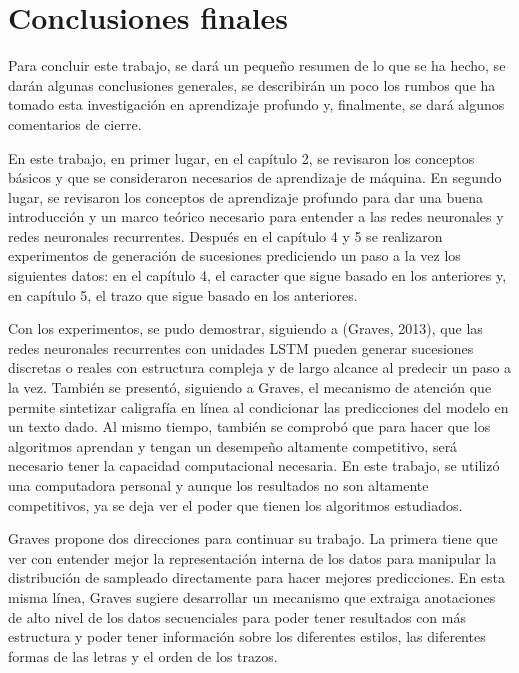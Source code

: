 \section{Conclusiones finales}
Para concluir este trabajo, se dará un pequeño resumen de lo que se ha hecho, se darán algunas conclusiones generales, se describirán un poco los rumbos que ha tomado esta investigación en aprendizaje profundo y, finalmente, se dará algunos comentarios de cierre.

\vspace{1em}

En este trabajo, en primer lugar, en el capítulo 2, se revisaron los conceptos básicos y que se consideraron necesarios de aprendizaje de máquina. En segundo lugar, se revisaron los conceptos de aprendizaje profundo para dar una buena introducción y un marco teórico necesario para entender a las redes neuronales y redes neuronales recurrentes. Después en el capítulo 4 y 5 se realizaron experimentos de generación de sucesiones prediciendo un paso a la vez los siguientes datos: en el capítulo 4, el caracter que sigue basado en los anteriores y, en capítulo 5, el trazo que sigue basado en los anteriores.

\vspace{1em}

Con los experimentos, se pudo demostrar, siguiendo a (Graves, 2013), que las redes neuronales recurrentes con unidades LSTM pueden generar sucesiones discretas o reales con estructura compleja y de largo alcance al predecir un paso a la vez. También se presentó, siguiendo a Graves, el mecanismo de atención que permite sintetizar caligrafía en línea al condicionar las predicciones del modelo en un texto dado. Al mismo tiempo, también se comprobó que para hacer que los algoritmos aprendan y tengan un desempeño altamente competitivo, será necesario tener la capacidad computacional necesaria. En este trabajo, se utilizó una computadora personal y aunque los resultados no son altamente competitivos, ya se deja ver el poder que tienen los algoritmos estudiados.
\cite{DBLP:journals/corr/Graves13}

\vspace{1em}

Graves propone dos direcciones para continuar su trabajo. La primera tiene que ver con entender mejor la representación interna de los datos para manipular la distribución de sampleado directamente para hacer mejores predicciones. En esta misma línea, Graves sugiere desarrollar un mecanismo que extraiga anotaciones de alto nivel de los datos secuenciales para poder tener resultados con más estructura y poder tener información sobre los diferentes estilos, las diferentes formas de las letras y el orden de los trazos.
\cite{DBLP:journals/corr/Graves13}

